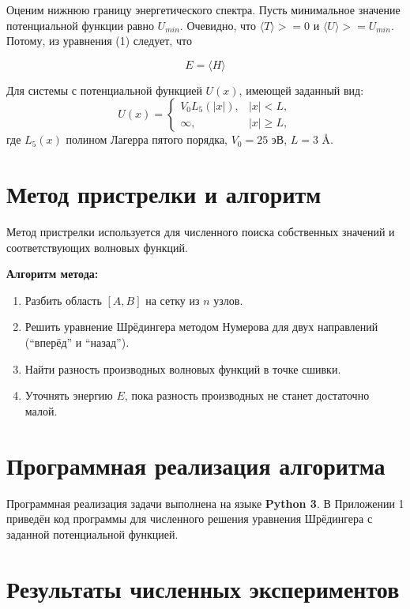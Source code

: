 \documentclass[a4paper, 12pt]{article}
\begin{document}
Оценим нижнюю границу энергетического спектра. Пусть минимальное значение потенциальной функции равно $U_{min}$. Очевидно, что $\langle T \rangle  >= 0$ и $\langle U \rangle >= U_{min}$. Потому, из уравнения (1) следует, что

\begin{equation}
    E = \langle H \rangle
\end{equation}

Для системы с потенциальной функцией \( U(x) \), имеющей заданный вид:
\begin{equation}
U(x) = \begin{cases} V_0 L_5(|x|), & |x| < L, \\ \infty, & |x| \geq L, \end{cases}
\end{equation}
где $L_5(x)$ \textendash{} полином Лагерра пятого порядка, $V_0 = 25$ эВ, $L = 3$ \AA.

\section{Метод пристрелки и алгоритм}
Метод пристрелки используется для численного поиска собственных значений и соответствующих волновых функций.

\textbf{Алгоритм метода:}
\begin{enumerate}
    \item Разбить область $[A, B]$ на сетку из $n$ узлов.
    \item Решить уравнение Шрёдингера методом Нумерова для двух направлений (``вперёд'' и ``назад'').
    \item Найти разность производных волновых функций в точке сшивки.
    \item Уточнять энергию $E$, пока разность производных не станет достаточно малой.
\end{enumerate}

\section{Программная реализация алгоритма}
Программная реализация задачи выполнена на языке \textbf{Python 3}. В Приложении 1 приведён код программы для численного решения уравнения Шрёдингера с заданной потенциальной функцией.

\section{Результаты численных экспериментов}
\end{document}
